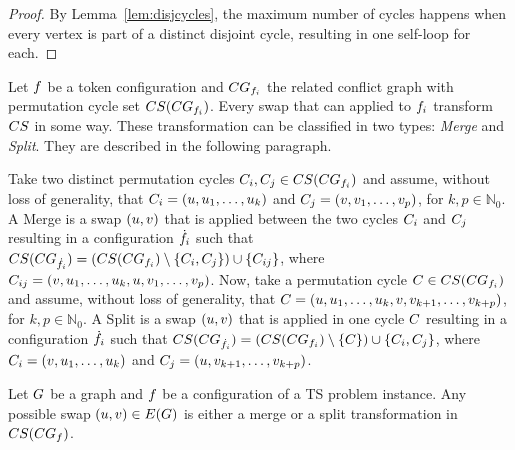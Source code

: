\documentclass[msc,english,table,xcdraw]{ppgccufmg}
\begin{document}
\begin{proof}
By Lemma~\ref{lem:disjcycles}, the maximum number of cycles happens when every 
vertex is part of a distinct disjoint cycle, resulting in one self-loop for 
each.
\end{proof}

Let $f$ be a token configuration and $CG_{
f_{i}}$ the related conflict graph with permutation cycle set 
$CS(CG_{f_{i}})$.
Every swap that can applied to $f_{i}$ transform $CS$ in some way.
These transformation can be classified in two types: \textit{Merge} and 
\textit{Split}.
They are described in the following paragraph.

Take two distinct permutation cycles $C_{i},C_{j} \in CS(CG_{f_{i}})$ and assume, without loss of 
generality, that $C_{i} = (u, u_{1}, \ldots, 
u_{k})$ and $C_{j} = (v, v_{1}, \ldots, 
v_{p})$, for $k,p \in  \mathbb{N}_{0}$.
A Merge is a swap $(u, v)$ that is applied between the
two cycles $C_{i}$ and $C_{j}$ resulting in a configuration 
$\dot{f_{i}}$ such that $CS(CG_{\dot{f_{i}}
}) = (CS(CG_{f_{i}}) \setminus \{C_{i}, C_{j}\}) \cup \{C_{ij}\}$, where $C_{ij} = (v,u_{1},\ldots,u_{k}, u, v_{1}, \ldots, 
v_{p})$.
Now, take a permutation cycle $C \in CS(CG_
{f_{i}})$ and assume, without loss of generality, that $C = 
(u,u_{1},\ldots,u_{k}, v, v_{k+1}, 
\ldots, v_{k+p})$, for $k,p \in \mathbb{N}_{0}$.
A Split is a swap $(u, v)$ that is applied in one cycle 
$C$ resulting in a configuration $\dot{f_{i}}$ such that $CS(CG_{\dot{f_{i}}}) = (CS(
CG_{f_{i}}) \setminus \{C\}) \cup \{C_{i}, 
C_{j}\}$, where $C_{i} = (v, u_{1}, \ldots, 
u_{k})$ and $C_{j} = (u, v_{k+1}, \ldots, 
v_{k+p})$.

\begin{lemma}
\label{lem:allswaps}
Let $G$ be a graph and $f$ be a configuration of a TS problem 
instance.
Any possible swap $(u, v) \in E(G)$ is either a 
merge or a split transformation in $CS(CG_
{f})$.
\end{lemma}
\end{document}
